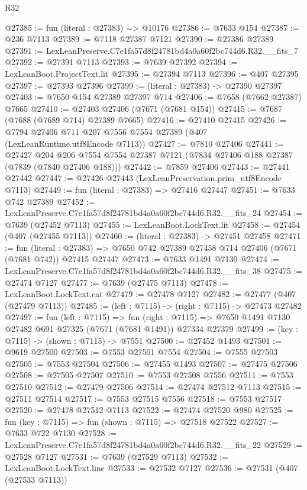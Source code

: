 \begin{lexlean}{R32}
\begin{coremodule}
@27385 := fun (literal : @27383) => @10176
@27386 := @7633 @154
@27387 := @236 @7113
@27389 := @7118 @27387 @7121
@27390 := @27386 @27389
@27391 := LexLeanPreserve.C7e1fa57d8f24781bd4a0a60f2bc744d6.R32.__fits_7
@27392 := @27391 @7113
@27393 := @7639 @27392
@27394 := LexLeanBoot.ProjectText.lit
@27395 := @27394 @7113
@27396 := @407 @27395
@27397 := @27393 @27396
@27399 := (literal : @27383) -> @27390 @27397
@27403 := @7650 @154 @27389 @27397 @714
@27406 := @7658 (@7662 @27387) @7665
@27410 := @27403 @27406 (@7671 (@7681 @154))
@27415 := @7687 (@7688 (@7689 @714) @27389 @7665)
@27416 := @27410 @27415
@27426 := @7794 @27406 @711 @207 @7556 @7554 @27389 (@407 (LexLeanRuntime.utf8Encode @7113))
@27427 := @7810 @27406
@27441 := @27427
    @204
    @206
    @7554
    @7554
    @27387
    @7121
    (@7834 @27406 @188 @27387 (@7839 (@7840 @27406 @188)))
@27442 := @7859 @27406
@27443 := @27441 @27442
@27447 := @27426 @27443 (LexLeanPreservation.prim_utf8Encode @7113)
@27449 := fun (literal : @27383) => @27416 @27447
@27451 := @7633 @742 @27389
@27452 := LexLeanPreserve.C7e1fa57d8f24781bd4a0a60f2bc744d6.R32.__fits_24
@27454 := @7639 (@27452 @7113)
@27455 := LexLeanBoot.LockText.lit
@27458 := @27454 (@407 (@27455 @7113))
@27460 := (literal : @27383) -> @27451 @27458
@27471 := fun (literal : @27383) =>
  @7650 @742 @27389 @27458 @714 @27406 (@7671 (@7681 @742)) @27415 @27447
@27473 := @7633 @1491 @7130
@27474 := LexLeanPreserve.C7e1fa57d8f24781bd4a0a60f2bc744d6.R32.__fits_38
@27475 := @27474 @7127
@27477 := @7639 (@27475 @7113)
@27478 := LexLeanBoot.LockText.cat
@27479 := @27478 @7127
@27482 := @27477 (@407 (@27479 @7113))
@27485 := (left : @7115) -> (right : @7115) -> @27473 @27482
@27497 := fun (left : @7115) =>
  fun (right : @7115) => @7650 @1491 @7130 @27482 @691 @27325 (@7671 (@7681 @1491)) @27334 @27379
@27499 := (key : @7115) -> (shown : @7115) -> @7551
@27500 := @27452 @1493
@27501 := @9619 @27500
@27503 := @7553 @27501 @7554
@27504 := @7555 @27503
@27505 := @7553 @27504
@27506 := @27455 @1493
@27507 := @27475 @27506
@27508 := @27505 @27507
@27510 := @7553 @27508 @7556
@27511 := @7553 @27510
@27512 := @27479 @27506
@27514 := @27474 @27512 @7113
@27515 := @27511 @27514
@27517 := @7553 @27515 @7556
@27518 := @7553 @27517
@27520 := @27478 @27512 @7113
@27522 := @27474 @27520 @980
@27525 := fun (key : @7115) => fun (shown : @7115) => @27518 @27522
@27527 := @7633 @722 @7130
@27528 := LexLeanPreserve.C7e1fa57d8f24781bd4a0a60f2bc744d6.R32.__fits_22
@27529 := @27528 @7127
@27531 := @7639 (@27529 @7113)
@27532 := LexLeanBoot.LockText.line
@27533 := @27532 @7127
@27536 := @27531 (@407 (@27533 @7113))

\end{coremodule}
\end{lexlean}
